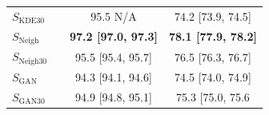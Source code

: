 \begin{table}[ht!]
\begin{minipage}[t]{0.98\textwidth}
{\begin{tabularx}{0.6\linewidth}{lccc}
$S_{\text{KDE}30}$   &                        & 95.5 N/A              & 74.2 {[}73.9, 74.5{]} \\
$S_{\text{Neigh}}$   &                        & \textbf{97.2 {[}97.0, 97.3{]}} & \textbf{78.1 {[}77.9, 78.2{]}} \\
$S_{\text{Neigh}30}$ &                        & 95.5 {[}95.4, 95.7{]} & 76.5 {[}76.3, 76.7{]} \\
$S_{\text{GAN}}$     &                        & 94.3 {[}94.1, 94.6{]} & 74.5 {[}74.0, 74.9{]} \\
$S_{\text{GAN}30}$   &                        & 94.9 {[}94.8, 95.1{]} & 75.3 {[}75.0, 75.6   \\
\bottomrule
\end{tabularx}
}
\label{tab:accuracy_digits}
\end{minipage}
\vspace{-.2in}
\end{table}
